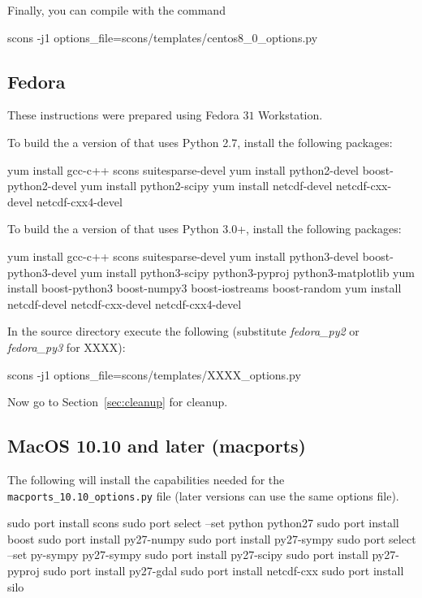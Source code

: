 Finally, you can compile \escript with the command
\begin{shellCode}
scons -j1 options_file=scons/templates/centos8_0_options.py
\end{shellCode}

\subsection{Fedora}\label{sec:fedorasrc}
These instructions were prepared using Fedora $31$ Workstation.

\noindent To build the a version of \escript that uses Python 2.7, install the following packages:
\begin{shellCode}
yum install gcc-c++ scons suitesparse-devel
yum install python2-devel boost-python2-devel
yum install python2-scipy
yum install netcdf-devel netcdf-cxx-devel netcdf-cxx4-devel
\end{shellCode}

\noindent To build the a version of \escript that uses Python 3.0+, install the following packages:
\begin{shellCode}
yum install gcc-c++ scons suitesparse-devel
yum install python3-devel boost-python3-devel
yum install python3-scipy python3-pyproj python3-matplotlib
yum install boost-python3 boost-numpy3 boost-iostreams boost-random
yum install netcdf-devel netcdf-cxx-devel netcdf-cxx4-devel
\end{shellCode}

\noindent In the source directory execute the following (substitute \textit{fedora_py2} or \textit{fedora_py3} for XXXX):
\begin{shellCode}
scons -j1 options_file=scons/templates/XXXX_options.py
\end{shellCode}

\noindent Now go to Section~\ref{sec:cleanup} for cleanup.

\subsection{MacOS 10.10 and later (macports)}\label{sec:macportsrc}

The following will install the capabilities needed for the \texttt{macports_10.10_options.py} file (later versions can use the same options file).

\begin{shellCode}
sudo port install scons
sudo port select --set python python27
sudo port install boost
sudo port install py27-numpy
sudo port install py27-sympy
sudo port select --set py-sympy py27-sympy
sudo port install py27-scipy
sudo port install py27-pyproj
sudo port install py27-gdal
sudo port install netcdf-cxx
sudo port install silo
\end{shellCode}

